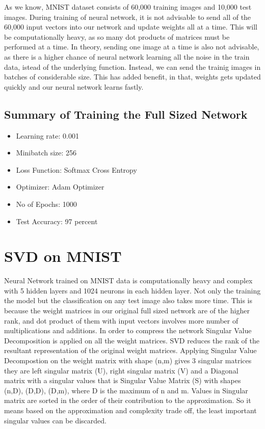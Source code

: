 As we know, MNIST dataset consists of 60,000 training images and 10,000 test
images. During training of neural network, it is not advisable to send all of
the 60,000 input vectors into our network and update weights all at a time.
This will be computationally heavy, as so many dot products of matrices must
be performed at a time. In theory, sending one image at a time is also not
advisable, as there is a higher chance of neural network learning all the
noise in the train data, istead of the underlying function. Instead, we can
send the trainig images in batches of considerable size. This has added
benefit, in that, weights gets updated quickly and our neural network learns
fastly.


\subsection{Summary of Training the Full Sized Network}

\begin{itemize}

 \item Learning rate: 0.001
 \item Minibatch size: 256
 \item Loss Function: Softmax Cross Entropy
 \item Optimizer: Adam Optimizer
 \item No of Epochs: 1000
 \item Test Accuracy: 97 percent

\end{itemize}

\section{SVD on MNIST}

Neural Network trained on MNIST data is computationally heavy and complex with 5
hidden layers and 1024 neurons in each hidden layer. Not only the training the
model but the classification on any test image also takes more time.  This is
because the weight matrices in our original full sized network are of the higher
rank, and dot product of them with input vectors involves more number of
multiplications and additions.   In order to compress the network Singular Value
Decomposition is applied on all the weight matrices. SVD reduces the rank of the
resultant representation of the original weight matrices. Applying Singular
Value Decompostion on the weight matrix with shape (n,m) gives 3 singular
matrices they are left singular matrix (U), right singular matrix (V) and a
Diagonal matrix with a singular values that is Singular Value Matrix (S) with
shapes (n,D), (D,D), (D,m),  where D is the maximum of n and m. Values in Singular
matrix are sorted in the order of their contribution to the approximation. So it
means based on the approximation and complexity trade off, the  least important
singular values can be discarded.

